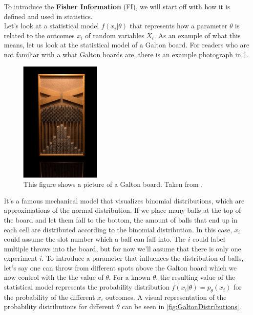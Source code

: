 To introduce the \textbf{Fisher Information} (FI), we will start off with how it is defined and used in statistics.\\
Let's look at a statistical model $f(x_i|\theta)$ that represents how a parameter $\theta$ is related to the outcomes $x_i$ of random variables $X_i$\cite{StatisticFisherInfoTutorial}. As an example of what this means, let us look at the statistical model of a Galton board. For readers who are not familiar with a what Galton boards are, there is an example photograph in \cref{fig:GaltonPicture}. 
\begin{figure}
	\centering
	\includegraphics[width = 4cm]{text/FisherInformation/plots/GaltonBoard.jpg}
	\caption{This figure shows a picture of a Galton board. Taken from \cite{GaltonBoardPicture}.}
	\label{fig:GaltonPicture}
\end{figure}
It's a famous mechanical model that visualizes binomial distributions, which are approximations of the normal distribution. If we place many balls at the top of the board and let them fall to the bottom, the amount of balls that end up in each cell are distributed according to the binomial distribution. In this case, $x_i$ could assume the slot number which a ball can fall into. The $i$ could label multiple throws into the board, but for now we'll assume that there is only one experiment $i$. To introduce a parameter that influences the distribution of balls, let's say one can throw from different spots above the Galton board which we now control with the the value of $\theta$. For a known $\theta$, the resulting value of the statistical model represents the probability distribution $f(x_i|\theta) = p_\theta(x_i)$ for the probability of the different $x_i$ outcomes. A visual representation of the probability distributions for different $\theta$ can be seen in \cref{fig:GaltonDistributions}.
